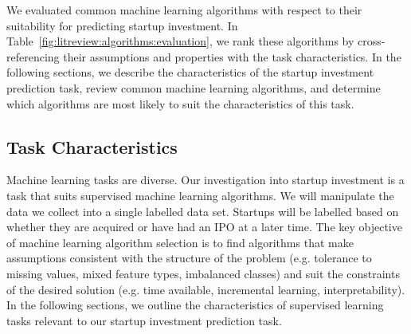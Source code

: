 \documentclass[../thesis/thesis.tex]{subfiles}
\begin{document}
We evaluated common machine learning algorithms with respect to their suitability for predicting startup investment. In Table~\ref{fig:litreview:algorithms:evaluation}, we rank these algorithms by cross-referencing their assumptions and properties with the task characteristics. In the following sections, we describe the characteristics of the startup investment prediction task, review common machine learning algorithms, and determine which algorithms are most likely to suit the characteristics of this task.


\subsection{Task Characteristics}

Machine learning tasks are diverse. Our investigation into startup investment is a task that suits supervised machine learning algorithms. We will manipulate the data we collect into a single labelled data set. Startups will be labelled based on whether they are acquired or have had an IPO at a later time. The key objective of machine learning algorithm selection is to find algorithms that make assumptions consistent with the structure of the problem (e.g. tolerance to missing values, mixed feature types, imbalanced classes) and suit the constraints of the desired solution (e.g. time available, incremental learning, interpretability). In the following sections, we outline the characteristics of supervised learning tasks relevant to our startup investment prediction task.
\end{document}
